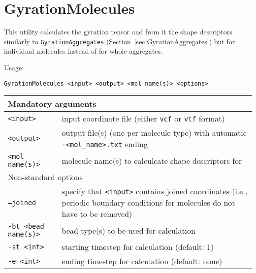 \section{GyrationMolecules} \label{sec:GyrationMolecules}

This utility calculates the gyration tensor and from it the shape
descriptors similarly to \texttt{GyrationAggregates}
(Section~\ref{sec:GyrationAggregates}) but for individual molecules
instead of for whole aggregates.

Usage:

\vspace{1em}
\noindent
\texttt{GyrationMolecules <input> <output> <mol name(s)> <options>}

\noindent
\begin{longtable}{p{}p{}}
  \toprule
  \multicolumn{2}{l}{Mandatory arguments} \\
  \midrule
  \texttt{<input>} & input coordinate file (either \texttt{vcf} or
    \texttt{vtf} format) \\
  \texttt{<output>} & output file(s) (one per molecule type) with
    automatic \texttt{-<mol\_name>.txt} ending \\
  \texttt{<mol name(s)>} & molecule name(s) to calculcate shape descriptors for \\
  \toprule
  \multicolumn{2}{l}{Non-standard options} \\
  \midrule
  \texttt{--joined} & specify that \texttt{<input>} contains joined
    coordinates (i.e., periodic boundary conditions for molecules do not
    have to be removed) \\
  \texttt{-bt <bead name(s)>} & bead type(s) to be used for calculation \\
  \texttt{-st <int>} & starting timestep for calculation (default: 1) \\
  \texttt{-e <int>} & ending timestep for calculation (default: none) \\
  \bottomrule
\end{longtable}

